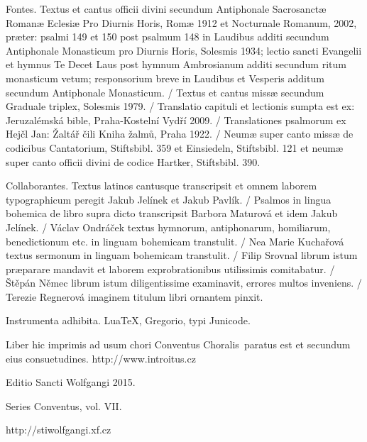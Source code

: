 \documentclass[a4paper, twoside, 12pt]{article}
\newcommand{\annusEditionis}{2015}
\begin{document}
\cantusSineNeumas

%

\vfill
\pagebreak

\newpage
\RemoveSideThumbs
\pagestyle{empty}

\vfill

Fontes.
Textus et cantus officii divini secundum
Antiphonale Sacrosanctæ Romanæ Eclesiæ Pro Diurnis Horis, Romæ 1912
et Nocturnale Romanum, 2002, præter: psalmi 149 et 150 post
psalmum 148 in Laudibus additi secundum Antiphonale Monasticum pro Diurnis Horis,
Solesmis 1934; lectio sancti Evangelii et hymnus Te Decet Laus post hymnum
Ambrosianum additi secundum ritum monasticum vetum; responsorium breve
in Laudibus et Vesperis additum secundum Antiphonale Monasticum. /
Textus et cantus missæ secundum
Graduale triplex, Solesmis 1979. /
Translatio capituli et lectionis sumpta est ex:
Jeruzalémská bible, Praha-Kostelní Vydří 2009. /
Translationes psalmorum ex
Hejčl Jan: Žaltář čili Kniha žalmů, Praha 1922. /
Neumæ super canto missæ de codicibus Cantatorium, Stiftsbibl. 359 et Einsiedeln,
Stiftsbibl. 121 et neumæ super canto officii divini de codice Hartker,
Stiftsbibl. 390.

Collaborantes.
Textus latinos cantusque transcripsit et omnem laborem typographicum peregit
Jakub Jelínek et Jakub Pavlík. /
Psalmos in lingua bohemica de libro supra dicto transcripsit
Barbora Maturová et idem Jakub Jelínek. /
Václav Ondráček textus hymnorum, antiphonarum, homiliarum, benedictionum etc.
in linguam bohemicam transtulit. /
Nea Marie Kuchařová textus sermonum in linguam bohemicam transtulit. /
Filip Srovnal librum istum præparare mandavit et laborem exprobrationibus
utilissimis comitabatur. /
Štěpán Němec librum istum diligentissime examinavit, errores multos
inveniens. /
Terezie Regnerová imaginem titulum libri ornantem pinxit.

Instrumenta adhibita.
LuaTeX, %
Gregorio, %
typi Junicode. %

\begin{center}
Liber hic imprimis ad usum chori
\guillemotright Conventus Choralis\guillemotleft\
paratus est
et secundum eius consuetudines.
http://www.introitus.cz

\vfill

{\large Editio Sancti Wolfgangi \annusEditionis.}

\vfill

Series \guillemotright Conventus\guillemotleft, vol. VII.

\vfill

http://stiwolfgangi.xf.cz

\end{center}

\vfill
\end{document}

